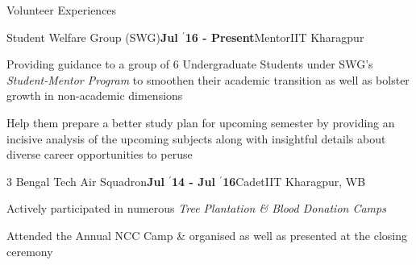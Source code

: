 \documentclass{resume} %
\begin{document}
\begin{rSection}{Volunteer Experiences}

\begin{rSubsection}{\large Student Welfare Group (SWG)}{\textbf{\large Jul $^{\prime}$16 - Present}}{Mentor}{IIT Kharagpur}
\item Providing guidance to a group of 6 Undergraduate Students under SWG's \textit{Student-Mentor Program} to smoothen their academic transition as well as bolster growth in non-academic dimensions
\item Help them prepare a better study plan for upcoming semester by providing an incisive analysis of the upcoming subjects along with insightful details about diverse career opportunities to peruse
\end{rSubsection}

\begin{rSubsection}{\large 3 Bengal Tech Air Squadron}{\textbf{\large Jul $^{\prime}$14 - Jul $^{\prime}$16}}{Cadet}{IIT Kharagpur, WB}
\item Actively participated in numerous \textit{Tree Plantation \& Blood Donation Camps}
\item Attended the Annual NCC Camp \& organised as well as presented at the closing ceremony
\end{rSubsection}

\end{rSection}

\end{document}
